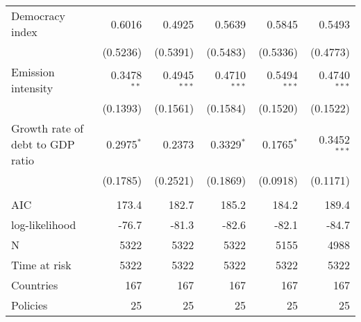 \begin{tabular}{lrrrrr}
Democracy index                  &            0.6016 &            0.4925 &            0.5639 &            0.5845 &            0.5493 \\
                                 &          (0.5236) &          (0.5391) &          (0.5483) &          (0.5336) &          (0.4773) \\
Emission intensity               &    0.3478$^{* *}$ &  0.4945$^{* * *}$ &  0.4710$^{* * *}$ &  0.5494$^{* * *}$ &  0.4740$^{* * *}$ \\
                                 &          (0.1393) &          (0.1561) &          (0.1584) &          (0.1520) &          (0.1522) \\
Growth rate of debt to GDP ratio &      0.2975$^{*}$ &            0.2373 &      0.3329$^{*}$ &      0.1765$^{*}$ &  0.3452$^{* * *}$ \\
                                 &          (0.1785) &          (0.2521) &          (0.1869) &          (0.0918) &          (0.1171) \\
                                 &                   &                   &                   &                   &                   \\
AIC                              &             173.4 &             182.7 &             185.2 &             184.2 &             189.4 \\
log-likelihood                   &             -76.7 &             -81.3 &             -82.6 &             -82.1 &             -84.7 \\
N                                &              5322 &              5322 &              5322 &              5155 &              4988 \\
Time at risk                     &              5322 &              5322 &              5322 &              5322 &              5322 \\
Countries                        &               167 &               167 &               167 &               167 &               167 \\
Policies                         &                25 &                25 &                25 &                25 &                25 \\
\bottomrule
\end{tabular}
